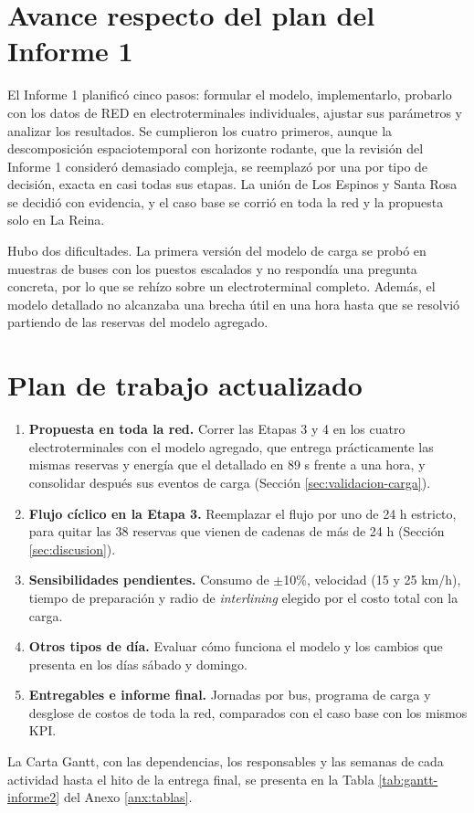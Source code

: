 \section{Avance respecto del plan del Informe 1}
\label{sec:avance}

El Informe 1 planificó cinco pasos: formular el modelo, implementarlo, probarlo con los datos de RED en electroterminales individuales, ajustar sus parámetros y analizar los resultados. Se cumplieron los cuatro primeros, aunque la descomposición espaciotemporal con horizonte rodante, que la revisión del Informe 1 consideró demasiado compleja, se reemplazó por una por tipo de decisión, exacta en casi todas sus etapas. La unión de Los Espinos y Santa Rosa se decidió con evidencia, y el caso base se corrió en toda la red y la propuesta solo en La Reina.

Hubo dos dificultades. La primera versión del modelo de carga se probó en muestras de buses con los puestos escalados y no respondía una pregunta concreta, por lo que se rehízo sobre un electroterminal completo. Además, el modelo detallado no alcanzaba una brecha útil en una hora hasta que se resolvió partiendo de las reservas del modelo agregado.

\section{Plan de trabajo actualizado}
\label{sec:plan}

\begin{enumerate}
    \renewcommand{\labelenumi}{(\roman{enumi})}
    \item \textbf{Propuesta en toda la red.} Correr las Etapas 3 y 4 en los cuatro electroterminales con el modelo agregado, que entrega prácticamente las mismas reservas y energía que el detallado en 89 s frente a una hora, y consolidar después sus eventos de carga (Sección \ref{sec:validacion-carga}).
    \item \textbf{Flujo cíclico en la Etapa 3.} Reemplazar el flujo por uno de 24 h estricto, para quitar las 38 reservas que vienen de cadenas de más de 24 h (Sección \ref{sec:discusion}).
    \item \textbf{Sensibilidades pendientes.} Consumo de $\pm$10\%, velocidad (15 y 25 km/h), tiempo de preparación y radio de \textit{interlining} elegido por el costo total con la carga.
    \item \textbf{Otros tipos de día.} Evaluar cómo funciona el modelo y los cambios que presenta en los días sábado y domingo.
    \item \textbf{Entregables e informe final.} Jornadas por bus, programa de carga y desglose de costos de toda la red, comparados con el caso base con los mismos KPI.
\end{enumerate}

La Carta Gantt, con las dependencias, los responsables y las semanas de cada actividad hasta el hito de la entrega final, se presenta en la Tabla \ref{tab:gantt-informe2} del Anexo \ref{anx:tablas}.
